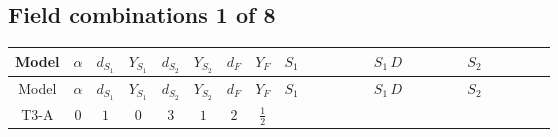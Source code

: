 \documentclass[8pt]{article}
\begin{document}
\begin{landscape}
\subsection*{Field combinations 1 of 8}
\begin{longtable}{@{}cccccccc >{\raggedright\arraybackslash}p{0.21\linewidth} >{\raggedright\arraybackslash}p{0.21\linewidth} >{\raggedright\arraybackslash}p{0.21\linewidth}@{}}
\toprule
Model & $\alpha$ & $d_{S_1}$ & $Y_{S_1}$ & $d_{S_2}$ & $Y_{S_2}$ & $d_F$ & $Y_F$ & $S_1$ & $S_1\,D$ & $S_2$ \\
\midrule
\endfirsthead
\toprule
Model & $\alpha$ & $d_{S_1}$ & $Y_{S_1}$ & $d_{S_2}$ & $Y_{S_2}$ & $d_F$ & $Y_F$ & $S_1$ & $S_1\,D$ & $S_2$ \\
\midrule
\endhead
T3-A & $0$ & $1$ & $0$ & $3$ & $1$ & $2$ & $\frac{1}{2}$ & \scriptsize\adjustbox{max width=\linewidth}{$\begin{gathered} -\frac{2 \hbar  \overline{y_{1,i_1,r_1}} \overline{y_{1,i_2,r_2}} S_1^2 y_{1,i_1,r_2} y_{1,i_2,r_1} \left(S_1{}^{\dagger }\right){}^2}{\epsilon } \\ -C_{S_1^\dagger S_1} S_1 S_1{}^{\dagger } \\ +C_{S_1^\dagger S_1} \hbar  \overline{y_{1,i_1,r_1}} S_1 y_{1,i_1,r_1} S_1{}^{\dagger }\end{gathered}$} & \scriptsize\adjustbox{max width=\linewidth}{$\begin{gathered} +D_{\mu _1}\left(S_1\right){}^{\dagger } D_{\mu _1}\left(S_1\right)\end{gathered}$} & \scriptsize\adjustbox{max width=\linewidth}{$\begin{gathered} +\frac{2 \hbar  \overline{y_{2,i_1,r_1}} \overline{y_{2,i_2,r_2}} S_{2,j_2}^2 y_{2,i_1,r_2} y_{2,i_2,r_1} \left(S_{2,j_1}{}^{\dagger }\right){}^2}{3 \epsilon } \\ -C_{S_2^\dagger S_2} S_{2,j_1} S_{2,j_1}{}^{\dagger } \\ +\frac{C_{S_2^\dagger S_2} \hbar  \overline{y_{2,i_1,r_1}} S_{2,j_1} y_{2,i_1,r_1} S_{2,j_1}{}^{\dagger }}{\sqrt{3}}\end{gathered}$} \\

\end{longtable}
\end{landscape}
\end{document}
